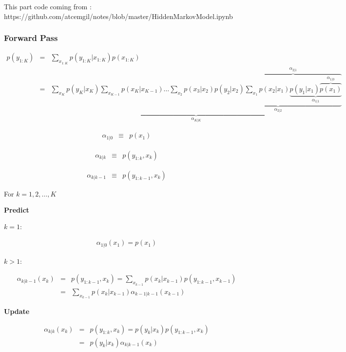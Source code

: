 \documentclass[11pt]{article}
\begin{document}
This part code coming from :
https://github.com/atcemgil/notes/blob/master/HiddenMarkovModel.ipynb

\subsubsection{Forward Pass}\label{forward-pass}

\begin{eqnarray}
p(y_{1:K}) & = & \sum_{x_{1:K}} p(y_{1:K}|x_{1:K}) p(x_{1:K}) \\
& = &  \underbrace{\sum_{x_K} p(y_K | x_K ) \sum_{x_{K-1}} p(x_K|x_{K-1})  \dots \sum_{x_{2}} p(x_3|x_{2})
\underbrace{ p(y_{2}|x_{2}) \overbrace{ \sum_{x_{1}} p(x_2|x_{1})
\underbrace{ p(y_{1}|x_{1}) \overbrace{ p(x_1)}^{\alpha_{1|0}}}_{\alpha_{1|1}}
}^{\alpha_{2|1}} }_{\alpha_{2|2}}}_{\alpha_{K|K}}
\end{eqnarray}

\begin{eqnarray}
\alpha_{1|0} & \equiv & p(x_1)
\end{eqnarray}

\begin{eqnarray}
\alpha_{k|k} & \equiv & p(y_{1:k}, x_k)
\end{eqnarray}

\begin{eqnarray}
\alpha_{k|k-1}  & \equiv & p(y_{1:k-1}, x_k)
\end{eqnarray}

For \(k=1, 2, \dots, K\)

\textbf{Predict}

\(k=1\):

\begin{eqnarray}
\alpha_{1|0}(x_1) = p(x_1)
\end{eqnarray}

\(k>1\):

\begin{eqnarray}
{\alpha_{k|k-1}(x_k)} & = & p(y_{1:k-1}, x_k) = \sum_{x_{k-1}} p(x_k| x_{k-1}) p(y_{1:k-1}, x_{k-1}) \\
& = & \sum_{x_{k-1}} p(x_k| x_{k-1}) { \alpha_{k-1|k-1}(x_{k-1}) }
\end{eqnarray}

\textbf{Update}

\begin{eqnarray}
{\alpha_{k|k}(x_k) } & = & p(y_{1:k}, x_k) = p(y_k | x_k) p(y_{1:k-1}, x_k) \\
 & = & p(y_k | x_k) {\alpha_{k|k-1}(x_k)}
\end{eqnarray}
\end{document}
